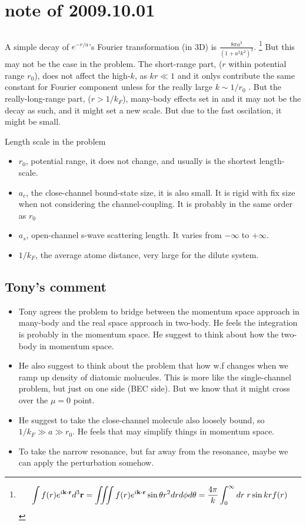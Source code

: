 \section{note of 2009.10.01}
\subsection{}
A simple decay of $e^{-r/a}$'s Fourier transformation (in 3D) is $\frac{8\pi{} a^3 }{\left(1+a^2 k^2\right)^2}$.  
\footnote{
\begin{equation}\label{eq:3dFourier}
\int{f(r)e^{i\ensuremath{\mathbf{k}}\cdot\ensuremath{\mathbf{r}}}d^3\ensuremath{\mathbf{r}}}=\iiint{f(r)e^{i\ensuremath{\mathbf{k}}\cdot\ensuremath{\mathbf{r}}}\sin\theta{r^2}drd\phi{d}\theta}=\frac{4\pi}{k}\int_0^{\infty}dr\;r\sin{kr}f(r)
\end{equation} 
}%
But this may not be the case in the problem.  The short-range part, ($r$ within potential range $r_0$), does not affect the high-$k$, as $kr\ll1$ and it onlys contribute the same constant for Fourier component unless for the really large $k\sim{1/r_0}$ .  But the really-long-range part, ($r>1/k_F$), many-body effects set in and it may not be the decay as such, and it might set a new scale.  But due to the fast oscilation, it might be small.

Length scale in the problem
\begin{itemize}
	\item $r_0$, potential range, it does not change, and usually is the shortest length-scale. 
	\item $a_c$, the close-channel bound-state size, it is also small.  It is rigid with fix size when not considering the channel-coupling.  It is probably in the same order as $r_0$
	\item $a_s$, open-channel s-wave scattering length. It varies from $-\infty$ to $+\infty$.
	\item $1/k_F$, the average atome distance, very large for the dilute system.  
\end{itemize}
\subsection{Tony's comment}
\begin{itemize}
\item Tony agrees the problem to bridge between the momentum space approach in many-body and the real space approach in two-body.  He feels the integration is probably in the momentum space.  He suggest to think about how the two-body in momentum space.  
\item He also suggest to think about the problem that how w.f changes when we ramp up density of diatomic molucules.  This is more like the single-channel problem, but just on one side (BEC side).  But we know that it might cross over the $\mu=0$ point.  
\item He suggest to take the close-channel molecule also loosely bound, so $1/k_F\gg{a}\gg{r_0}$.  He feels that may simplify things in momentum space. 
\item To take the narrow resonance, but far away from the resonance, maybe we can apply the perturbation somehow.  
\end{itemize}

